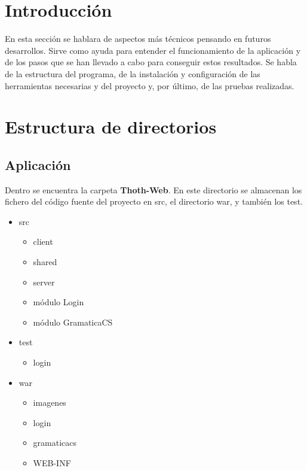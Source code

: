 
\section{Introducción}

En esta sección se hablara de aspectos más técnicos pensando en futuros desarrollos. Sirve como ayuda para entender el funcionamiento de la aplicación y de los pasos que se han llevado a cabo para conseguir estos resultados. Se habla de la estructura del programa, de la instalación y configuración de las herramientas necesarias y del proyecto y, por último, de las pruebas realizadas.

\section{Estructura de directorios}


\subsection{Aplicación}
Dentro se encuentra la carpeta \textbf{Thoth-Web}. En este directorio se almacenan los fichero del código fuente del proyecto en src, el directorio war, y también los test.

\begin{itemize}
	\item src
		\begin{itemize}
			\item client
			\item shared
			\item server
			\item módulo Login
			\item módulo GramaticaCS
		\end{itemize}
	\item test
		\begin{itemize}
			\item login
			
		\end{itemize}
	\item war
		\begin{itemize}
			\item imagenes
			\item login
			\item gramaticacs
			\item WEB-INF
		\end{itemize}
\end{itemize}	

